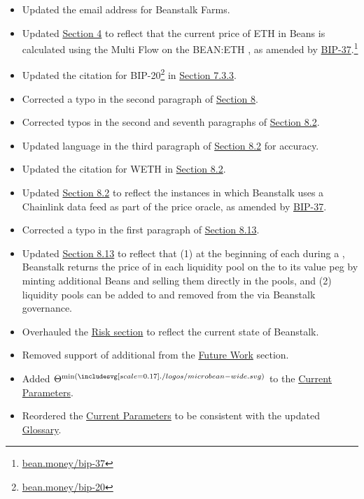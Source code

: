 \documentclass[class=article, crop=false]{standalone}
\begin{document}
\begin{itemize}[topsep=0pt, itemsep=3pt,leftmargin=16pt]
    \begin{itemize}
        \item Updated the email address for Beanstalk Farms.
        \item Updated \hyperlink{section.4}{Section 4} to reflect that the current price of ETH in Beans is calculated using the Multi Flow  on the BEAN:ETH , as amended by \href{https://bean.money/bip-37}{BIP-37}.\footnote{\href{https://bean.money/bip-37}{bean.money/bip-37}}
        \item Updated the citation for BIP-20\footnote{\href{https://bean.money/bip-20}{bean.money/bip-20}} in \hyperlink{subsubsection.7.3.3.}{Section 7.3.3}.
        \item Corrected a typo in the second paragraph of \hyperlink{section.8}{Section 8}.
        \item Corrected typos in the second and seventh paragraphs of \hyperlink{subsection.8.2}{Section 8.2}.
        \item Updated language in the third paragraph of \hyperlink{subsection.8.2}{Section 8.2} for accuracy.
        \item Updated the citation for WETH in \hyperlink{subsection.8.2}{Section 8.2}.
        \item Updated \hyperlink{subsection.8.2}{Section 8.2} to reflect the instances in which Beanstalk uses a Chainlink data feed as part of the price oracle, as amended by \href{https://bean.money/bip-37}{BIP-37}.
        \item Corrected a typo in the first paragraph of \hyperlink{subsection.8.13}{Section 8.13}.
        \item Updated \hyperlink{subsection.8.13}{Section 8.13} to reflect that (1) at the beginning of each  during a , Beanstalk returns the price of  in each liquidity pool on the  to its value peg by minting additional Beans and selling them directly in the pools, and (2) liquidity pools can be added to and removed from the  via Beanstalk governance.
        \item Overhauled the \hyperlink{section.12}{Risk section} to reflect the current state of Beanstalk.
        \item Removed support of additional  from the \hyperlink{section.13}{Future Work} section.
        \item Added $\Theta^{\text{min}(\bean)}$ to the \hyperlink{subsection.14.1}{Current Parameters}.
        \item Reordered the \hyperlink{subsection.14.1}{Current Parameters} to be consistent with the updated  \hyperlink{subsection.14.11}{Glossary}.

\end{itemize}
\end{itemize}
\end{document}
